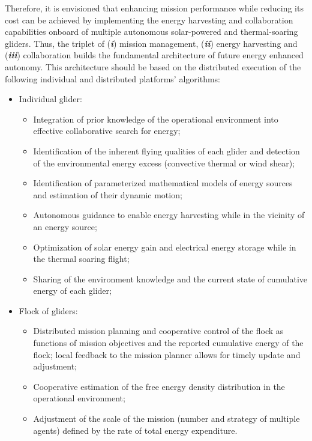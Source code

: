\documentclass{ifacconf}
\begin{document}
Therefore, it is envisioned that enhancing mission performance while reducing its cost can be achieved by implementing the energy harvesting and collaboration capabilities onboard of multiple autonomous solar-powered and thermal-soaring gliders. Thus, the triplet of (\emph{\textbf{i}}) mission management, (\emph{\textbf{ii}}) energy harvesting and (\emph{\textbf{iii}}) collaboration builds the fundamental architecture of future energy enhanced autonomy.  This architecture should be based on the distributed execution of the following individual and distributed platforms' algorithms:
\begin{itemize}[leftmargin=0.35cm]
 \item Individual glider:
 \begin{itemize}[leftmargin=0.25cm]
 \item Integration of prior knowledge of the operational environment into effective collaborative search for energy;
 \item Identification of the inherent flying qualities of each glider and detection of the environmental energy excess (convective thermal or wind shear);
 \item Identification of parameterized mathematical models of energy sources and estimation of their dynamic motion;
 \item Autonomous guidance to enable energy harvesting while in the vicinity of an energy source;
 \item Optimization of solar energy gain and electrical energy storage while in the thermal soaring flight;
 \item Sharing of the environment knowledge and the current state of cumulative energy of each glider;
 \end{itemize}
\item Flock of gliders:
\begin{itemize}[leftmargin=0.25cm]
  \item Distributed mission planning and cooperative control of the flock as functions of mission objectives and the reported cumulative energy of the flock; local feedback to the mission planner allows for timely update and adjustment;
  \item Cooperative estimation of the free energy density distribution in the operational environment;
  \item Adjustment of the scale of the mission (number and strategy of multiple agents) defined by the rate of total energy expenditure.
\end{itemize}
\end{itemize}
\end{document}
